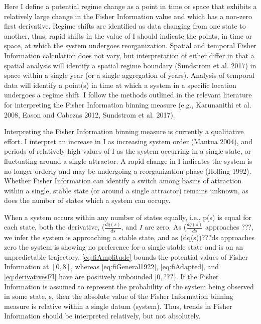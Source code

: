 \documentclass[12pt,twoside]{reedthesis}
\begin{document}
Here I define a potential regime change as a point in time or space that
exhibits a relatively large change in the Fisher Information value and
which has a non-zero first derivative. Regime shifts are identified as
data changing from one state to another, thus, rapid shifts in the value
of I should indicate the points, in time or space, at which the system
undergoes reorganization. Spatial and temporal Fisher Information
calculation does not vary, but interpretation of either differ in that a
spatial analysis will identify a spatial regime boundary (Sundstrom et
al. 2017) in space within a single year (or a single aggregation of
years). Analysis of temporal data will identify a point(s) in time at
which a system in a specific location undergoes a regime shift. I follow
the methods outlined in the relevant literature for interpreting the
Fisher Information binning measure (e.g., Karunanithi et al. 2008, Eason
and Cabezas 2012, Sundstrom et al. 2017).

Interpreting the Fisher Information binning measure is currently a
qualitative effort. I interpret an increase in I as increasing system
order (Mantua 2004), and periods of relatively high values of I as the
system occurring in a single state, or fluctuating around a single
attractor. A rapid change in I indicates the system is no longer orderly
and may be undergoing a reorganization phase (Holling 1992). Whether
Fisher Information can identify a switch among basins of attraction
within a single, stable state (or around a single attractor) remains
unknown, as does the number of states which a system can occupy.

When a system occurs within any number of states equally, i.e., p(s) is
equal for each state, both the derivative, (\(\frac{dq(s)}{ds}\), and
\(I\) are zero. As (\(\frac{dq(s)}{ds}\) approaches ???, we infer the
system is approaching a stable state, and as (dq(s))???ds approaches
zero the system is showing no preference for a single stable state and
is on an unpredictable trajectory. \eqref{eq:fiAmplitude} bounds the
potential values of Fisher Information at \([0, 8]\), whereas
\eqref{eq:fiGeneral1922}, \eqref{eq:fiAdapted}, and \eqref{eq:derivativesFI}
have are positively unbounded \([0, ???)\). If the Fisher Information is
assumed to represent the probability of the system being observed in
some state, s, then the absolute value of the Fisher Information binning
measure is relative within a single datum (system). Thus, trends in
Fisher Information should be interpreted relatively, but not absolutely.
\end{document}

